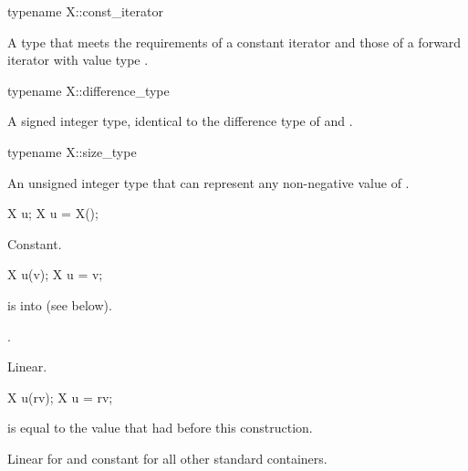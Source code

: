 %
\begin{itemdecl}
typename X::const_iterator
\end{itemdecl}

\begin{itemdescr}
\pnum
\result
A type that meets the requirements of a constant iterator and
those of a forward iterator with value type .
\end{itemdescr}

%
\begin{itemdecl}
typename X::difference_type
\end{itemdecl}

\begin{itemdescr}
\pnum
\result
A signed integer type,
identical to the difference type of
 and .
\end{itemdescr}

%
\begin{itemdecl}
typename X::size_type
\end{itemdecl}

\begin{itemdescr}
\pnum
\result
An unsigned integer type
that can represent any non-negative value of .
\end{itemdescr}

\begin{itemdecl}
X u;
X u = X();
\end{itemdecl}

\begin{itemdescr}
\pnum
\ensures
{}

\pnum
\complexity
Constant.
\end{itemdescr}

\begin{itemdecl}
X u(v);
X u = v;
\end{itemdecl}

\begin{itemdescr}
\pnum
\expects
{} is  into  (see below).

\pnum
\ensures
{}.

\pnum
\complexity
Linear.
\end{itemdescr}

\begin{itemdecl}
X u(rv);
X u = rv;
\end{itemdecl}

\begin{itemdescr}
\pnum
\ensures
{} is equal to the value that  had before this construction.

\pnum
\complexity
Linear for  and constant for all other standard containers.
\end{itemdescr}

